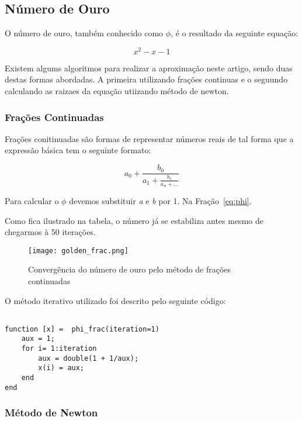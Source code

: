 \subsection{Número de Ouro}

	O número de ouro, também conhecido como $\phi$, é o resultado da seguinte
	equação:

	\begin{equation}
		x^2-x-1
	\end{equation}

	Existem algums algoritmos para realizar a aproximação neste artigo, sendo
	duas destas formas  abordadas. A primeira utilizando frações continuas e o
	seguundo calculando as raizaes da equação utiizando método de newton.

\subsubsection{Frações Continuadas}

	Frações conitinuadas são formas de representar números reais de tal forma
	que a expressão básica tem o seguinte formato:

	\begin{equation}\label{eq:phi}
		a_0 + \frac{b_0}{a_1 + \frac{b_1}{a_n + \dots}}
	\end{equation}

	Para calcular o $\phi$ devemos substituir \emph{a} e \emph{b} por 1. Na
	Fração~\ref{eq:phi}.

	

Como fica ilustrado na tabela, o número já se estabiliza antes mesmo de
chegarmos à 50 iterações.

\begin{figure}[H]
    \centering
    \texttt{[image: golden\_frac.png]}
    \caption{Convergência do número de ouro pelo método de frações continuadas}
    \label{golden_frac}
\end{figure}


O método iterativo utilizado foi descrito pelo seguinte código:

\begin{lstlisting}

function [x] =  phi_frac(iteration=1)
	aux = 1;
	for i= 1:iteration
		aux = double(1 + 1/aux);
		x(i) = aux;
	end
end

\end{lstlisting}

\subsubsection{Método de Newton}

